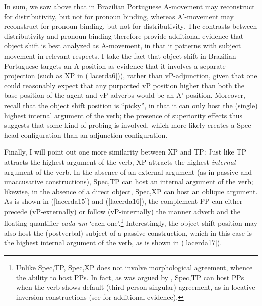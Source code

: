 \documentclass[output=paper]{langscibook}
\begin{document}
In sum, we saw above that in Brazilian Portuguese A-movement may reconstruct for distributivity, but not for pronoun binding, whereas A’-movement may reconstruct for pronoun binding, but not for distributivity. The contrasts between distributivity and pronoun binding therefore provide additional evidence that object shift is best analyzed as A-movement, in that it patterns with subject movement in relevant respects. I take the fact that object shift in Brazilian Portuguese targets an A-position as evidence that it involves a separate projection (such as XP in (\ref{lacerda6})), rather than vP-adjunction, given that one could reasonably expect that any purported vP position higher than both the base position of the agent and vP adverbs would be an A’-position. Moreover, recall that the object shift position is “picky”, in that it can only host the (single) highest internal argument of the verb; the presence of superiority effects thus suggests that some kind of probing is involved, which more likely creates a Spec-head configuration than an adjunction configuration.

Finally, I will point out one more similarity between XP and TP: Just like TP attracts the highest argument of the verb, XP attracts the highest \emph{internal} argument of the verb. In the absence of an external argument (as in passive and unaccusative constructions), Spec,TP can host an internal argument of the verb; likewise, in the absence of a direct object, Spec,XP can host an oblique argument. As is shown in (\ref{lacerda15}) and (\ref{lacerda16}), the complement PP can either precede (vP-externally) or follow (vP-internally) the manner adverb and the floating quantifier \emph{cada um} ‘each one’.\footnote{Unlike Spec,TP, Spec,XP does not involve morphological agreement, whence the ability to host PPs. In fact, as was argued by \citet{Avelar2009}, Spec,TP can host PPs when the verb shows default (third-person singular) agreement, as in locative inversion constructions (see \citealt{Lacerda2016a,Lacerda2020b} for additional evidence).} Interestingly, the object shift position may also host the (postverbal) subject of a passive construction, which in this case is the highest internal argument of the verb, as is shown in (\ref{lacerda17}).
\end{document}
